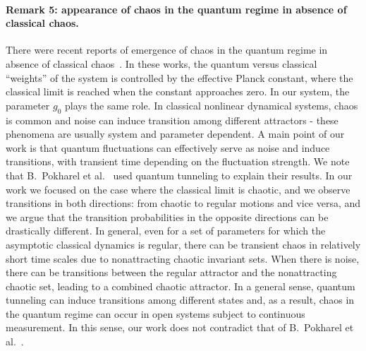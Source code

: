 \documentclass[12pt]{wlscirep}
\begin{document}
\paragraph*{Remark 5: appearance of chaos in the quantum regime in absence of
classical chaos.}
There were recent reports of emergence of chaos in the quantum regime in 
absence of classical chaos~\cite{PDMLHAKP:2016,EHC:2016}. In these works,
the quantum versus classical ``weights'' of the system is controlled by
the effective Planck constant, where the classical limit is reached
when the constant approaches zero. In our system, the parameter $g_0$ plays 
the same role. In classical nonlinear dynamical systems, chaos is common and 
noise can induce transition among different attractors - these phenomena are 
usually system and parameter dependent. A main point of our work is that quantum
fluctuations can effectively serve as noise and induce transitions, with
transient time depending on the fluctuation strength. We note that B.~Pokharel 
et al.~\cite{PDMLHAKP:2016} used quantum tunneling to explain their results. 
In our work we focused on the case where the classical limit is chaotic,
and we observe transitions in both directions: from chaotic to regular
motions and vice versa, and we argue that the transition probabilities
in the opposite directions can be drastically different. In general, even
for a set of parameters for which the asymptotic classical dynamics is
regular, there can be transient chaos in relatively short time scales
due to nonattracting chaotic invariant sets. When there is noise, there
can be transitions between the regular attractor and the nonattracting
chaotic set, leading to a combined chaotic attractor. In a general sense,
quantum tunneling can induce transitions among different states and, as
a result, chaos in the quantum regime can occur in open systems subject to
continuous measurement. In this sense, our work does not contradict that
of B.~Pokharel et al.~\cite{PDMLHAKP:2016}.
\end{document}
